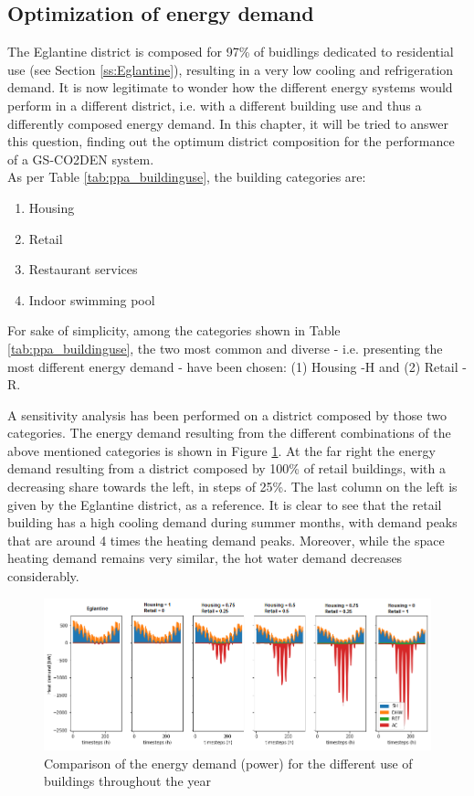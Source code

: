 \documentclass{article}
\begin{document}
\subsection{Optimization of energy demand}
The Eglantine district is composed for 97\% of buidlings dedicated to residential use (see Section \ref{ss:Eglantine}), resulting in a very low cooling and refrigeration demand. It is now legitimate to wonder how the different energy systems would perform in a different district, i.e. with a different building use and thus a differently composed energy demand. In this chapter, it will be tried to answer this question, finding out the optimum district composition for the performance of a GS-CO2DEN system.\\

As per Table \ref{tab:ppa_buildinguse}, the building categories are:
\begin{enumerate}
	\item Housing
	\item Retail
	\item Restaurant services
	\item Indoor swimming pool
\end{enumerate}
For sake of simplicity, among the categories shown in Table \ref{tab:ppa_buildinguse}, the two most common and diverse - i.e. presenting the most different energy demand - have been chosen: (1) Housing -H and (2) Retail - R. 

A sensitivity analysis has been performed on a district composed by those two categories. The energy demand resulting from the different combinations of the above mentioned categories is shown in Figure \ref{fig:CU_E}. At the far right the energy demand resulting from a district composed by 100\% of retail buildings, with a decreasing share towards the left, in steps of 25\%. The last column on the left is given by the Eglantine district, as a reference. It is clear to see that the retail building has a high cooling demand during summer months, with demand peaks that are around 4 times the heating demand peaks. Moreover, while the space heating demand remains very similar, the hot water demand decreases considerably.\\



\begin{figure}[htp]
	\centering
	\includegraphics[width=1\textwidth]{CU_Edemand.png}
	\caption{Comparison of the energy demand (power) for the different use of buildings throughout the year}
	\label{fig:CU_E}
\end{figure}
\end{document}
